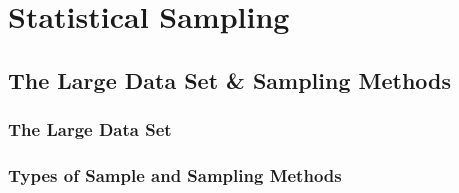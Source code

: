 \documentclass[../alevelmaths.tex]{subfiles}
\begin{document}
\chapter{Statistical Sampling}
\section{The Large Data Set \& Sampling Methods}
\subsection*{The Large Data Set}
\subsection*{Types of Sample and Sampling Methods}
\end{document}
